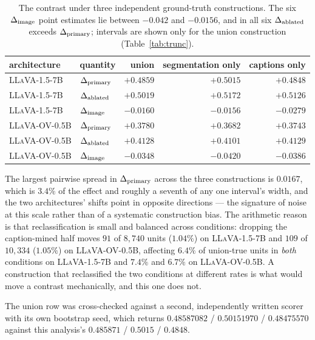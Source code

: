 \begin{table}[htb]
\caption{The contrast under three independent ground-truth constructions. The six $\Delta_{\mathrm{image}}$ point estimates lie between $-0.042$ and
$-0.0156$, and in all six $\Delta_{\mathrm{ablated}}$ exceeds $\Delta_{\mathrm{primary}}$; intervals are
shown only for the union construction (Table~\ref{tab:trunc}).}
\label{tab:gtsens}
\begin{center}
\small
\begin{tabular}{llrrr}
\toprule
architecture & quantity & union & segmentation only & captions only \\
\midrule
\textsc{LLaVA-1.5-7B}  & $\Delta_{\mathrm{primary}}$ & $+0.4859$ & $+0.5015$ & $+0.4848$ \\
\textsc{LLaVA-1.5-7B}  & $\Delta_{\mathrm{ablated}}$ & $+0.5019$ & $+0.5172$ & $+0.5126$ \\
\textsc{LLaVA-1.5-7B}  & $\Delta_{\mathrm{image}}$ & $-0.0160$ & $-0.0156$ & $-0.0279$ \\
\midrule
\textsc{LLaVA-OV-0.5B} & $\Delta_{\mathrm{primary}}$ & $+0.3780$ & $+0.3682$ & $+0.3743$ \\
\textsc{LLaVA-OV-0.5B} & $\Delta_{\mathrm{ablated}}$ & $+0.4128$ & $+0.4101$ & $+0.4129$ \\
\textsc{LLaVA-OV-0.5B} & $\Delta_{\mathrm{image}}$ & $-0.0348$ & $-0.0420$ & $-0.0386$ \\
\bottomrule
\end{tabular}
\end{center}
\end{table}

The largest pairwise spread in $\Delta_{\mathrm{primary}}$ across the three constructions is $0.0167$, which is $3.4\%$
of the effect and roughly a seventh of any one interval's width, and the two architectures' shifts
point in opposite directions --- the signature of noise at this scale rather than of a systematic
construction bias. The arithmetic reason is that reclassification is small and balanced across
conditions: dropping the caption-mined half moves $91$ of $8{,}740$ units ($1.04\%$) on \textsc{LLaVA-1.5-7B} and $109$ of $10{,}334$ ($1.05\%$) on \textsc{LLaVA-OV-0.5B}, affecting $6.4\%$ of union-true units
in \emph{both} conditions on \textsc{LLaVA-1.5-7B} and $7.4\%$ and $6.7\%$ on \textsc{LLaVA-OV-0.5B}. A
construction that reclassified the two conditions at different rates is what would move a contrast
mechanically, and this one does not.

The union row was cross-checked against a second, independently written scorer with its own bootstrap
seed, which returns $0.48587082$ / $0.50151970$ / $0.48475570$ against this analysis's $0.485871$ /
$0.5015$ / $0.4848$.

